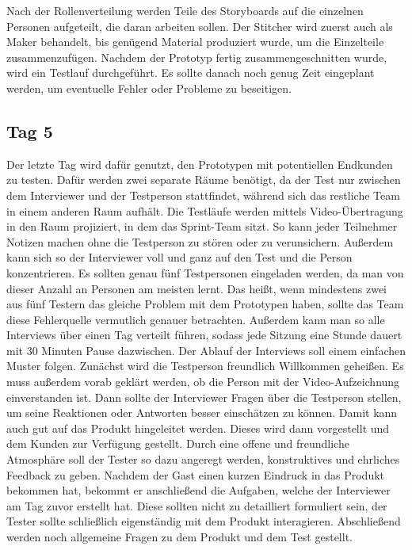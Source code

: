 Nach der Rollenverteilung werden Teile des Storyboards auf die einzelnen Personen aufgeteilt, die daran arbeiten sollen. Der Stitcher wird zuerst auch als Maker behandelt, bis genügend Material produziert wurde, um die Einzelteile zusammenzufügen. Nachdem der Prototyp fertig zusammengeschnitten wurde, wird ein Testlauf durchgeführt. Es sollte danach noch genug Zeit eingeplant werden, um eventuelle Fehler oder Probleme zu beseitigen.

\subsection*{Tag 5}
Der letzte Tag wird dafür genutzt, den Prototypen mit potentiellen Endkunden zu testen. Dafür werden zwei separate Räume benötigt, da der Test nur zwischen dem Interviewer und der Testperson stattfindet, während sich das restliche Team in einem anderen Raum aufhält. Die Testläufe werden mittels Video-Übertragung in den Raum projiziert, in dem das Sprint-Team sitzt. So kann jeder Teilnehmer Notizen machen ohne die Testperson zu stören oder zu verunsichern. Außerdem kann sich so der Interviewer voll und ganz auf den Test und die Person konzentrieren. Es sollten genau fünf Testpersonen eingeladen werden, da man von dieser Anzahl an Personen am meisten lernt. Das heißt, wenn mindestens zwei aus fünf Testern das gleiche Problem mit dem Prototypen haben, sollte das Team diese Fehlerquelle vermutlich genauer betrachten.
Außerdem kann man so alle Interviews über einen Tag verteilt führen, sodass jede Sitzung eine Stunde dauert mit 30 Minuten Pause dazwischen. Der Ablauf der Interviews soll einem einfachen Muster folgen. Zunächst wird die Testperson freundlich Willkommen geheißen. Es muss außerdem vorab geklärt werden, ob die Person mit der Video-Aufzeichnung einverstanden ist. Dann sollte der Interviewer Fragen über die Testperson stellen, um seine Reaktionen oder Antworten besser einschätzen zu können. Damit kann auch gut auf das Produkt hingeleitet werden. Dieses wird dann vorgestellt und dem Kunden zur Verfügung gestellt. Durch eine offene und freundliche Atmosphäre soll der Tester so dazu angeregt werden, konstruktives und ehrliches Feedback zu geben. Nachdem der Gast einen kurzen Eindruck in das Produkt bekommen hat, bekommt er anschließend die Aufgaben, welche der Interviewer am Tag zuvor erstellt hat. Diese sollten nicht zu detailliert formuliert sein, der Tester sollte schließlich eigenständig mit dem Produkt interagieren. Abschließend werden noch allgemeine Fragen zu dem Produkt und dem Test gestellt.

